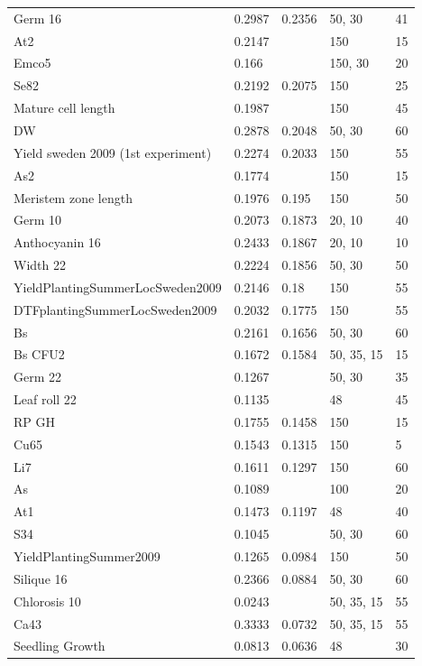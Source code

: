 \begin{longtable}{p{} p{} p{} p{} p{}}
  Germ 16 & 0.2987 & 0.2356 & 50, 30 & 41 \\
  At2 & 0.2147 & \color{red}{0.216} & 150 & 15 \\
  Emco5 & 0.166 & \color{red}{0.2101} & 150, 30 & 20 \\
  Se82 & 0.2192 & 0.2075 & 150 & 25 \\
  Mature cell length & 0.1987 & \color{red}{0.2052} & 150 & 45 \\
  DW  & 0.2878 & 0.2048 & 50, 30 & 60 \\
  Yield sweden 2009 (1st experiment) & 0.2274 & 0.2033 & 150 & 55 \\
  As2 & 0.1774 & \color{red}{0.1962} & 150 & 15 \\
  Meristem zone length & 0.1976 & 0.195 & 150 & 50 \\
  Germ 10 & 0.2073 & 0.1873 & 20, 10 & 40 \\
  Anthocyanin 16 & 0.2433 & 0.1867 & 20, 10 & 10 \\
  Width 22 & 0.2224 & 0.1856 & 50, 30 & 50 \\
  YieldPlantingSummerLocSweden2009 & 0.2146 & 0.18 & 150 & 55 \\
  DTFplantingSummerLocSweden2009 & 0.2032 & 0.1775 & 150 & 55 \\
  Bs & 0.2161 & 0.1656 & 50, 30 & 60 \\
  Bs CFU2 & 0.1672 & 0.1584 & 50, 35, 15 & 15 \\
  Germ 22 & 0.1267 & \color{red}{0.1533} & 50, 30 & 35 \\
  Leaf roll 22 & 0.1135 & \color{red}{0.1511} & 48 & 45 \\
  RP GH & 0.1755 & 0.1458 & 150 & 15 \\
  Cu65 & 0.1543 & 0.1315 & 150 & 5 \\
  Li7 & 0.1611 & 0.1297 & 150 & 60 \\
  As & 0.1089 & \color{red}{0.1227} & 100 & 20 \\
  At1 & 0.1473 & 0.1197 & 48 & 40 \\
  S34 & 0.1045 & \color{red}{0.11} & 50, 30 & 60 \\
  YieldPlantingSummer2009 & 0.1265 & 0.0984 & 150 & 50 \\
  Silique 16 & 0.2366 & 0.0884 & 50, 30 & 60 \\
  Chlorosis 10 & 0.0243 & \color{red}{0.088} & 50, 35, 15 & 55 \\
  Ca43 & 0.3333 & 0.0732 & 50, 35, 15 & 55 \\
  Seedling Growth & 0.0813 & 0.0636 & 48 & 30 \\

\end{longtable}
